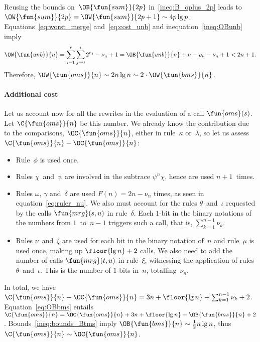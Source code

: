 Reusing the bounds on~\(\OB{\fun{sum}}{2p}\)
in~\eqref{ineq:B_oplus_2p} leads to \(\OW{\fun{sum}}{2p} =
\OW{\fun{sum}}{2p+1} \sim 4p\lg p\). Equations~\eqref{eq:worst_merge}
and~\eqref{eq:cost_unb} and inequation~\eqref{ineq:OBunb} imply
\begin{equation*}
\OW{\fun{unb}}{n} = \sum_{i=1}^{r}\sum_{j=0}^{i}{2^{e_j}} - \nu_n + 1
                  = \OB{\fun{unb}}{n} + n - \rho_n - \nu_n + 1
                  < 2n + 1.
\end{equation*}
Therefore, \(\OW{\fun{oms}}{n} \sim 2n\lg n \sim 2
\cdot \OW{\fun{bms}}{n}\).

\paragraph{Additional cost}

Let us account now for all the rewrites in the evaluation of a call
\(\fun{oms}(s)\). Let
\(\C{\fun{oms}}{n}\) be this number. We
already know the contribution due to the comparisons,
\(\OC{\fun{oms}}{n}\), either in
rule~\(\kappa\) or~\(\lambda\), so let us assess \(\C{\fun{oms}}{n} -
\OC{\fun{oms}}{n}\):
\begin{itemize}

  \item Rule~\(\phi\) is used once.

  \item Rules \(\chi\)~and~\(\psi\) are involved in the subtrace
    \(\psi^n\chi\), hence are used \(n+1\)~times.

  \item Rules \(\omega\), \(\gamma\) and~\(\delta\) are used \(F(n) =
    2n - \nu_n\) times, as seen in equation~\eqref{eq:ruler_nu}. We
    also must account for the rules \(\theta\)~and~\(\iota\) requested
    by the calls \(\fun{mrg}(s,u)\) in rule~\(\delta\). Each \(1\)-bit
    in the binary notations of the numbers from \(1\)~to~\(n-1\)
    triggers such a call, that is, \(\sum_{k=1}^{n-1}\nu_k\).

  \item Rules \(\nu\)~and~\(\xi\) are used for each bit in the binary
    notation of~\(n\) and rule~\(\mu\) is used once, making up
    \(\floor{\lg n} + 2\) calls. We also need to add the number of
    calls \(\fun{mrg}(t,u)\) in rule~\(\xi\),
    witnessing the application of rules \(\theta\)~and~\(\iota\). This
    is the number of \(1\)-bits in~\(n\), totalling~\(\nu_n\).

\end{itemize}
In total, we have \(\C{\fun{oms}}{n} - \OC{\fun{oms}}{n} = 3n +
\floor{\lg n} + \sum_{k=1}^{n-1}\nu_k + 2\). Equation~\eqref{eq:OBbms}
 entails \(\C{\fun{oms}}{n} = \OC{\fun{oms}}{n} +
3n + \floor{\lg n} + \OB{\fun{bms}}{n} +
2\). Bounds~\eqref{ineq:bounds_Btms}  imply
\(\OB{\fun{bms}}{n} \sim \tfrac{1}{2}n\lg n\), thus \(\C{\fun{oms}}{n}
\sim \OC{\fun{oms}}{n}\).   

